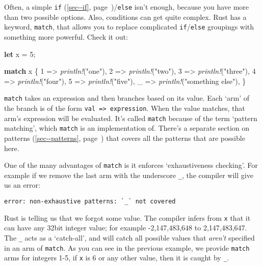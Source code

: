 \documentclass[a4paper,]{book}
\renewcommand*{\hyperlink}[2]{%
 #2 (\autoref{#1}, page~\pageref{#1})}
\newenvironment{Shaded}{\begin{snugshade}}{\end{snugshade}}
\newcommand{\KeywordTok}[1]{\textcolor[rgb]{0.13,0.29,0.53}{\textbf{{#1}}}}
\newcommand{\DecValTok}[1]{\textcolor[rgb]{0.00,0.00,0.81}{{#1}}}
\newcommand{\StringTok}[1]{\textcolor[rgb]{0.31,0.60,0.02}{{#1}}}
\newcommand{\PreprocessorTok}[1]{\textcolor[rgb]{0.56,0.35,0.01}{\textit{{#1}}}}
\newcommand{\NormalTok}[1]{{#1}}
\begin{document}
Often, a simple \protect\hyperlink{sec--if}{\texttt{if}}/\texttt{else}
isn't enough, because you have more than two possible options. Also,
conditions can get quite complex. Rust has a keyword, \texttt{match},
that allows you to replace complicated \texttt{if}/\texttt{else}
groupings with something more powerful. Check it out:

\begin{Shaded}
\begin{Highlighting}[]
\KeywordTok{let} \NormalTok{x = }\DecValTok{5}\NormalTok{;}

\KeywordTok{match} \NormalTok{x \{}
    \DecValTok{1} \NormalTok{=> }\PreprocessorTok{println!}\NormalTok{(}\StringTok{"one"}\NormalTok{),}
    \DecValTok{2} \NormalTok{=> }\PreprocessorTok{println!}\NormalTok{(}\StringTok{"two"}\NormalTok{),}
    \DecValTok{3} \NormalTok{=> }\PreprocessorTok{println!}\NormalTok{(}\StringTok{"three"}\NormalTok{),}
    \DecValTok{4} \NormalTok{=> }\PreprocessorTok{println!}\NormalTok{(}\StringTok{"four"}\NormalTok{),}
    \DecValTok{5} \NormalTok{=> }\PreprocessorTok{println!}\NormalTok{(}\StringTok{"five"}\NormalTok{),}
    \NormalTok{_ => }\PreprocessorTok{println!}\NormalTok{(}\StringTok{"something else"}\NormalTok{),}
\NormalTok{\}}
\end{Highlighting}
\end{Shaded}

\texttt{match} takes an expression and then branches based on its value.
Each `arm' of the branch is of the form
\texttt{val\ =\textgreater{}\ expression}. When the value matches, that
arm's expression will be evaluated. It's called \texttt{match} because
of the term `pattern matching', which \texttt{match} is an
implementation of. There's a \protect\hyperlink{sec--patterns}{separate
section on patterns} that covers all the patterns that are possible
here.

One of the many advantages of \texttt{match} is it enforces
`exhaustiveness checking'. For example if we remove the last arm with
the underscore \texttt{\_}, the compiler will give us an error:

\begin{verbatim}
error: non-exhaustive patterns: `_` not covered
\end{verbatim}

Rust is telling us that we forgot some value. The compiler infers from
\texttt{x} that it can have any 32bit integer value; for example
-2,147,483,648 to 2,147,483,647. The \texttt{\_} acts as a `catch-all',
and will catch all possible values that \emph{aren't} specified in an
arm of \texttt{match}. As you can see in the previous example, we
provide \texttt{match} arms for integers 1-5, if \texttt{x} is 6 or any
other value, then it is caught by \texttt{\_}.
\end{document}
